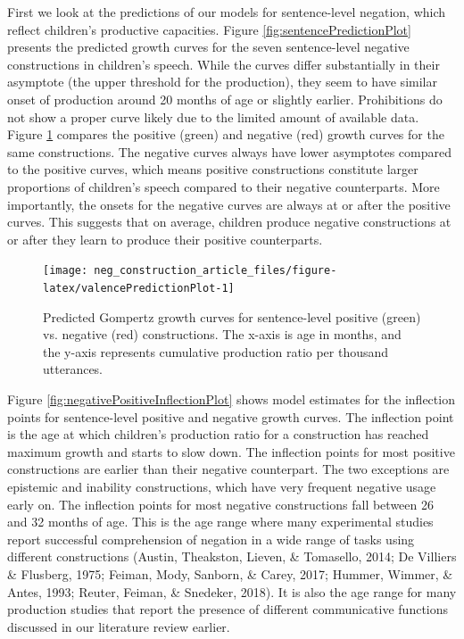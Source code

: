 \documentclass[
  man,floatsintext]{apa6}
\begin{document}
First we look at the predictions of our models for sentence-level negation, which reflect children's productive capacities. Figure \ref{fig:sentencePredictionPlot} presents the predicted growth curves for the seven sentence-level negative constructions in children's speech. While the curves differ substantially in their asymptote (the upper threshold for the production), they seem to have similar onset of production around 20 months of age or slightly earlier. Prohibitions do not show a proper curve likely due to the limited amount of available data. Figure \ref{fig:valencePredictionPlot} compares the positive (green) and negative (red) growth curves for the same constructions. The negative curves always have lower asymptotes compared to the positive curves, which means positive constructions constitute larger proportions of children's speech compared to their negative counterparts. More importantly, the onsets for the negative curves are always at or after the positive curves. This suggests that on average, children produce negative constructions at or after they learn to produce their positive counterparts.

\begin{figure}[H]

{\centering \texttt{[image: neg\_construction\_article\_files/figure-latex/valencePredictionPlot-1]} 

}

\caption{Predicted Gompertz growth curves for sentence-level positive (green) vs. negative (red) constructions. The x-axis is age in months, and the y-axis represents cumulative production ratio per thousand utterances.}\label{fig:valencePredictionPlot}
\end{figure}

Figure \ref{fig:negativePositiveInflectionPlot} shows model estimates for the inflection points for sentence-level positive and negative growth curves. The inflection point is the age at which children's production ratio for a construction has reached maximum growth and starts to slow down. The inflection points for most positive constructions are earlier than their negative counterpart. The two exceptions are epistemic and inability constructions, which have very frequent negative usage early on. The inflection points for most negative constructions fall between 26 and 32 months of age. This is the age range where many experimental studies report successful comprehension of negation in a wide range of tasks using different constructions (Austin, Theakston, Lieven, \& Tomasello, 2014; De Villiers \& Flusberg, 1975; Feiman, Mody, Sanborn, \& Carey, 2017; Hummer, Wimmer, \& Antes, 1993; Reuter, Feiman, \& Snedeker, 2018). It is also the age range for many production studies that report the presence of different communicative functions discussed in our literature review earlier.
\end{document}
